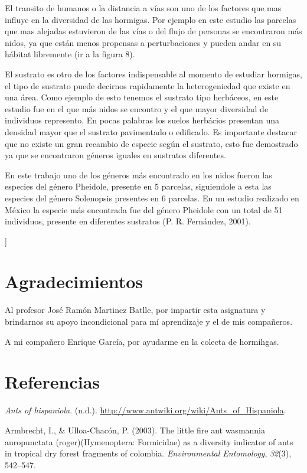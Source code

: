 \documentclass[11pt,]{article}
\begin{document}
El transito de humanos o la distancia a vías son uno de los factores que
mas influye en la diversidad de las hormigas. Por ejemplo en este
estudio las parcelas que mas alejadas estuvieron de las vías o del flujo
de personas se encontraron más nidos, ya que están menos propensas a
perturbaciones y pueden andar en su hábitat libremente (ir a la figura
8).

El sustrato es otro de los factores indispensable al momento de estudiar
hormigas, el tipo de sustrato puede decirnos rapidamente la
heterogeniedad que existe en una área. Como ejemplo de esto tenemos el
sustrato tipo herbáceos, en este estudio fue en el que más nidos se
encontro y el que mayor diversidad de individuos represento. En pocas
palabras los suelos herbácios presentan una densidad mayor que el
sustrato pavimentado o edificado. Es importante destacar que no existe
un gran recambio de especie según el sustrato, esto fue demostrado ya
que se encontraron géneros iguales en sustratos diferentes.

En este trabajo uno de los géneros más encontrado en los nidos fueron
las especies del género Pheidole, presente en 5 parcelas, siguiendole a
esta las especies del género Solenopsis presentes en 6 parcelas. En un
estudio realizado en México la especie más encontrada fue del género
Pheidole con un total de 51 individuos, presente en diferentes sustratos
(P. R. Fernández, 2001).

{]}

\section{Agradecimientos}\label{agradecimientos}

Al profesor José Ramón Martinez Batlle, por impartir esta asignatura y
brindarnos su apoyo incondicional para mí aprendizaje y el de mis
compañeros.

A mi compañero Enrique García, por ayudarme en la colecta de hormihgas.

\section*{Referencias}\label{referencias}

\hypertarget{refs}{}
\hypertarget{ref-AntWiki}{}
\emph{Ants of hispaniola}. (n.d.).
\url{http://www.antwiki.org/wiki/Ants_of_Hispaniola}.

\hypertarget{ref-armbrecht2003little}{}
Armbrecht, I., \& Ulloa-Chacón, P. (2003). The little fire ant wasmannia
auropunctata (roger)(Hymenoptera: Formicidae) as a diversity indicator
of ants in tropical dry forest fragments of colombia.
\emph{Environmental Entomology}, \emph{32}(3), 542--547.
\end{document}
